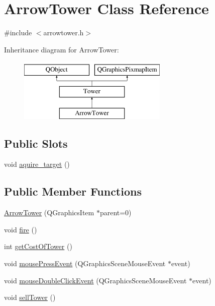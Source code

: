 \hypertarget{class_arrow_tower}{}\section{Arrow\+Tower Class Reference}
\label{class_arrow_tower}


{\ttfamily \#include $<$arrowtower.\+h$>$}

Inheritance diagram for Arrow\+Tower\+:\begin{figure}[H]
\begin{center}
\leavevmode
\includegraphics[height=3.000000cm]{class_arrow_tower}
\end{center}
\end{figure}
\subsection*{Public Slots}
\begin{DoxyCompactItemize}
\item 
void \hyperlink{class_arrow_tower_a0f2d63e9e3e3a8a1e6914711f3319df6}{aquire\+\_\+target} ()
\end{DoxyCompactItemize}
\subsection*{Public Member Functions}
\begin{DoxyCompactItemize}
\item 
\hyperlink{class_arrow_tower_a7b2c3a4465b810b204a46432266ba50e}{Arrow\+Tower} (Q\+Graphics\+Item $\ast$parent=0)
\item 
void \hyperlink{class_arrow_tower_ab4ed87128b5037a98640ab05e8721d88}{fire} ()
\item 
int \hyperlink{class_arrow_tower_a1ef82141056a39071f89d1c360728116}{get\+Cost\+Of\+Tower} ()
\item 
void \hyperlink{class_arrow_tower_afe62ccd8838829a0d7023d8eff079be2}{mouse\+Press\+Event} (Q\+Graphics\+Scene\+Mouse\+Event $\ast$event)
\item 
void \hyperlink{class_arrow_tower_a074c896d5ead33710d51e1c62a92862f}{mouse\+Double\+Click\+Event} (Q\+Graphics\+Scene\+Mouse\+Event $\ast$event)
\item 
void \hyperlink{class_arrow_tower_a7ac5bf2863d8a4c461d26a3a60dc62ab}{sell\+Tower} ()
\end{DoxyCompactItemize}
